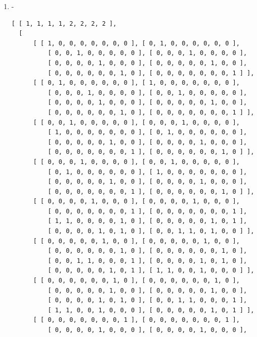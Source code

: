 \documentclass[a4paper, 10pt]{book}
\theoremstyle{definition}
\numberwithin{equation}{chapter}
\begin{document}
\begin{appendices}
\begin{enumerate}
\begin{lstlisting}[numbers=none]
          [ 0, 0, 0, 0, 0, 1, 0, 1 ], [ 0, 0, 0, 0, 1, 0, 1, 0 ], 
          [ 1, 1, 0, 0, 0, 1, 0, 0 ], [ 0, 0, 1, 1, 1, 0, 0, 0 ] ], 
      [ [ 0, 0, 0, 0, 0, 0, 0, 1 ], [ 0, 0, 0, 0, 0, 0, 0, 1 ], 
          [ 0, 0, 0, 0, 0, 0, 1, 0 ], [ 0, 0, 0, 0, 0, 0, 1, 0 ], 
          [ 0, 0, 0, 0, 1, 0, 1, 0 ], [ 0, 0, 0, 0, 0, 1, 0, 1 ], 
          [ 0, 0, 1, 1, 1, 0, 0, 0 ], [ 1, 1, 0, 0, 0, 1, 0, 0 ] ] ] ]
	\end{lstlisting}
	\item -\begin{lstlisting}[numbers=none]
	[ [ 1, 1, 1, 1, 2, 2, 2, 2 ], 
  [ 
      [ [ 1, 0, 0, 0, 0, 0, 0, 0 ], [ 0, 1, 0, 0, 0, 0, 0, 0 ], 
          [ 0, 0, 1, 0, 0, 0, 0, 0 ], [ 0, 0, 0, 1, 0, 0, 0, 0 ], 
          [ 0, 0, 0, 0, 1, 0, 0, 0 ], [ 0, 0, 0, 0, 0, 1, 0, 0 ], 
          [ 0, 0, 0, 0, 0, 0, 1, 0 ], [ 0, 0, 0, 0, 0, 0, 0, 1 ] ], 
      [ [ 0, 1, 0, 0, 0, 0, 0, 0 ], [ 1, 0, 0, 0, 0, 0, 0, 0 ], 
          [ 0, 0, 0, 1, 0, 0, 0, 0 ], [ 0, 0, 1, 0, 0, 0, 0, 0 ], 
          [ 0, 0, 0, 0, 1, 0, 0, 0 ], [ 0, 0, 0, 0, 0, 1, 0, 0 ], 
          [ 0, 0, 0, 0, 0, 0, 1, 0 ], [ 0, 0, 0, 0, 0, 0, 0, 1 ] ], 
      [ [ 0, 0, 1, 0, 0, 0, 0, 0 ], [ 0, 0, 0, 1, 0, 0, 0, 0 ], 
          [ 1, 0, 0, 0, 0, 0, 0, 0 ], [ 0, 1, 0, 0, 0, 0, 0, 0 ], 
          [ 0, 0, 0, 0, 0, 1, 0, 0 ], [ 0, 0, 0, 0, 1, 0, 0, 0 ], 
          [ 0, 0, 0, 0, 0, 0, 0, 1 ], [ 0, 0, 0, 0, 0, 0, 1, 0 ] ], 
      [ [ 0, 0, 0, 1, 0, 0, 0, 0 ], [ 0, 0, 1, 0, 0, 0, 0, 0 ], 
          [ 0, 1, 0, 0, 0, 0, 0, 0 ], [ 1, 0, 0, 0, 0, 0, 0, 0 ], 
          [ 0, 0, 0, 0, 0, 1, 0, 0 ], [ 0, 0, 0, 0, 1, 0, 0, 0 ], 
          [ 0, 0, 0, 0, 0, 0, 0, 1 ], [ 0, 0, 0, 0, 0, 0, 1, 0 ] ], 
      [ [ 0, 0, 0, 0, 1, 0, 0, 0 ], [ 0, 0, 0, 0, 1, 0, 0, 0 ], 
          [ 0, 0, 0, 0, 0, 0, 0, 1 ], [ 0, 0, 0, 0, 0, 0, 0, 1 ], 
          [ 1, 1, 0, 0, 0, 0, 1, 0 ], [ 0, 0, 0, 0, 0, 1, 0, 1 ], 
          [ 0, 0, 0, 0, 1, 0, 1, 0 ], [ 0, 0, 1, 1, 0, 1, 0, 0 ] ], 
      [ [ 0, 0, 0, 0, 0, 1, 0, 0 ], [ 0, 0, 0, 0, 0, 1, 0, 0 ], 
          [ 0, 0, 0, 0, 0, 0, 1, 0 ], [ 0, 0, 0, 0, 0, 0, 1, 0 ], 
          [ 0, 0, 1, 1, 0, 0, 0, 1 ], [ 0, 0, 0, 0, 1, 0, 1, 0 ], 
          [ 0, 0, 0, 0, 0, 1, 0, 1 ], [ 1, 1, 0, 0, 1, 0, 0, 0 ] ], 
      [ [ 0, 0, 0, 0, 0, 0, 1, 0 ], [ 0, 0, 0, 0, 0, 0, 1, 0 ], 
          [ 0, 0, 0, 0, 0, 1, 0, 0 ], [ 0, 0, 0, 0, 0, 1, 0, 0 ], 
          [ 0, 0, 0, 0, 1, 0, 1, 0 ], [ 0, 0, 1, 1, 0, 0, 0, 1 ], 
          [ 1, 1, 0, 0, 1, 0, 0, 0 ], [ 0, 0, 0, 0, 0, 1, 0, 1 ] ], 
      [ [ 0, 0, 0, 0, 0, 0, 0, 1 ], [ 0, 0, 0, 0, 0, 0, 0, 1 ], 
          [ 0, 0, 0, 0, 1, 0, 0, 0 ], [ 0, 0, 0, 0, 1, 0, 0, 0 ], 

\end{lstlisting}
\end{enumerate}
\end{appendices}
\end{document}
